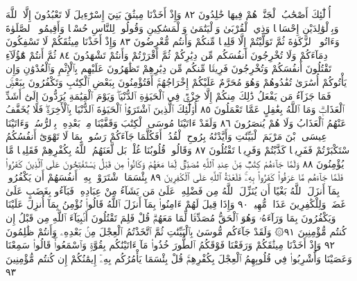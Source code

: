 أُو۟لَٰٓئِكَ أَصْحَٰبُ ٱلْجَنَّةِۖ هُمْ فِيهَا خَٰلِدُونَ ٨٢ وَإِذْ أَخَذْنَا
مِيثَٰقَ بَنِيٓ إِسْرَٰٓءِيلَ لَا تَعْبُدُونَ إِلَّا ٱللَّهَ وَبِٱلْوَٰلِدَيْنِ
إِحْسَانࣰا وَذِي ٱلْقُرْبَىٰ وَٱلْيَتَٰمَىٰ وَٱلْمَسَٰكِينِ وَقُولُوا۟
لِلنَّاسِ حُسْنࣰا وَأَقِيمُوا۟ ٱلصَّلَوٰةَ وَءَاتُوا۟ ٱلزَّكَوٰةَ ثُمَّ
تَوَلَّيْتُمْ إِلَّا قَلِيلࣰا مِّنكُمْ وَأَنتُم مُّعْرِضُونَ ٨٣
وَإِذْ أَخَذْنَا مِيثَٰقَكُمْ لَا تَسْفِكُونَ دِمَآءَكُمْ وَلَا تُخْرِجُونَ
أَنفُسَكُم مِّن دِيَٰرِكُمْ ثُمَّ أَقْرَرْتُمْ وَأَنتُمْ تَشْهَدُونَ ٨٤
ثُمَّ أَنتُمْ هَٰٓؤُلَآءِ تَقْتُلُونَ أَنفُسَكُمْ وَتُخْرِجُونَ فَرِيقࣰا
مِّنكُم مِّن دِيَٰرِهِمْ تَظَٰهَرُونَ عَلَيْهِم بِٱلْإِثْمِ وَٱلْعُدْوَٰنِ
وَإِن يَأْتُوكُمْ أُسَٰرَىٰ تُفَٰدُوهُمْ وَهُوَ مُحَرَّمٌ عَلَيْكُمْ
إِخْرَاجُهُمْۚ أَفَتُؤْمِنُونَ بِبَعْضِ ٱلْكِتَٰبِ وَتَكْفُرُونَ بِبَعْضࣲۚ
فَمَا جَزَآءُ مَن يَفْعَلُ ذَٰلِكَ مِنكُمْ إِلَّا خِزْيࣱ فِي ٱلْحَيَوٰةِ
ٱلدُّنْيَاۖ وَيَوْمَ ٱلْقِيَٰمَةِ يُرَدُّونَ إِلَىٰٓ أَشَدِّ ٱلْعَذَابِۗ وَمَا ٱللَّهُ
بِغَٰفِلٍ عَمَّا تَعْمَلُونَ ٨٥ أُو۟لَٰٓئِكَ ٱلَّذِينَ ٱشْتَرَوُا۟ ٱلْحَيَوٰةَ
ٱلدُّنْيَا بِٱلْأٓخِرَةِۖ فَلَا يُخَفَّفُ عَنْهُمُ ٱلْعَذَابُ وَلَا هُمْ يُنصَرُونَ ٨٦
وَلَقَدْ ءَاتَيْنَا مُوسَى ٱلْكِتَٰبَ وَقَفَّيْنَا مِنۢ بَعْدِهِۦ
بِٱلرُّسُلِۖ وَءَاتَيْنَا عِيسَى ٱبْنَ مَرْيَمَ ٱلْبَيِّنَٰتِ وَأَيَّدْنَٰهُ بِرُوحِ
ٱلْقُدُسِۗ أَفَكُلَّمَا جَآءَكُمْ رَسُولُۢ بِمَا لَا تَهْوَىٰٓ أَنفُسُكُمُ
ٱسْتَكْبَرْتُمْ فَفَرِيقࣰا كَذَّبْتُمْ وَفَرِيقࣰا تَقْتُلُونَ ٨٧ وَقَالُوا۟ قُلُوبُنَا
غُلْفُۢۚ بَل لَّعَنَهُمُ ٱللَّهُ بِكُفْرِهِمْ فَقَلِيلࣰا مَّا يُؤْمِنُونَ ٨٨
وَلَمَّا جَآءَهُمْ كِتَٰبࣱ مِّنْ عِندِ ٱللَّهِ مُصَدِّقࣱ لِّمَا مَعَهُمْ
وَكَانُوا۟ مِن قَبْلُ يَسْتَفْتِحُونَ عَلَى ٱلَّذِينَ كَفَرُوا۟ فَلَمَّا
جَآءَهُم مَّا عَرَفُوا۟ كَفَرُوا۟ بِهِۦۚ فَلَعْنَةُ ٱللَّهِ عَلَى ٱلْكَٰفِرِينَ ٨٩
بِئْسَمَا ٱشْتَرَوْا۟ بِهِۦٓ أَنفُسَهُمْ أَن يَكْفُرُوا۟ بِمَآ أَنزَلَ ٱللَّهُ
بَغْيًا أَن يُنَزِّلَ ٱللَّهُ مِن فَضْلِهِۦ عَلَىٰ مَن يَشَآءُ مِنْ عِبَادِهِۦۖ
فَبَآءُو بِغَضَبٍ عَلَىٰ غَضَبࣲۚ وَلِلْكَٰفِرِينَ عَذَابࣱ مُّهِينࣱ ٩٠
وَإِذَا قِيلَ لَهُمْ ءَامِنُوا۟ بِمَآ أَنزَلَ ٱللَّهُ قَالُوا۟ نُؤْمِنُ بِمَآ أُنزِلَ
عَلَيْنَا وَيَكْفُرُونَ بِمَا وَرَآءَهُۥ وَهُوَ ٱلْحَقُّ مُصَدِّقࣰا لِّمَا
مَعَهُمْۗ قُلْ فَلِمَ تَقْتُلُونَ أَنۢبِيَآءَ ٱللَّهِ مِن قَبْلُ إِن كُنتُم
مُّؤْمِنِينَ ٩١۞ وَلَقَدْ جَآءَكُم مُّوسَىٰ بِٱلْبَيِّنَٰتِ ثُمَّ
ٱتَّخَذْتُمُ ٱلْعِجْلَ مِنۢ بَعْدِهِۦ وَأَنتُمْ ظَٰلِمُونَ ٩٢ وَإِذْ
أَخَذْنَا مِيثَٰقَكُمْ وَرَفَعْنَا فَوْقَكُمُ ٱلطُّورَ خُذُوا۟
مَآ ءَاتَيْنَٰكُم بِقُوَّةࣲ وَٱسْمَعُوا۟ۖ قَالُوا۟ سَمِعْنَا وَعَصَيْنَا
وَأُشْرِبُوا۟ فِي قُلُوبِهِمُ ٱلْعِجْلَ بِكُفْرِهِمْۚ قُلْ بِئْسَمَا
يَأْمُرُكُم بِهِۦٓ إِيمَٰنُكُمْ إِن كُنتُم مُّؤْمِنِينَ ٩٣
